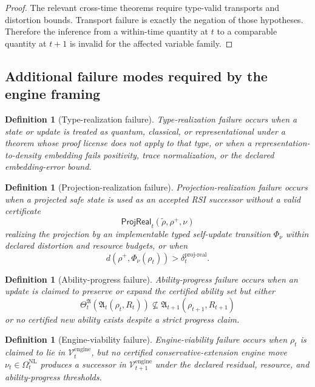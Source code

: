 \documentclass[11pt]{article}
\newtheorem{definition}[theorem]{Definition}
\newcommand{\1}{\mathbf{1}}
\providecommand{\Vcal}{\mathcal{V}}
\providecommand{\proj}{\mathrm{proj}}
\providecommand{\real}{\mathrm{real}}
\begin{document}
\begin{proof}
The relevant cross-time theorems require type-valid transports and distortion bounds. Transport failure is exactly the negation of those hypotheses. Therefore the inference from a within-time quantity at \(t\) to a comparable quantity at \(t+1\) is invalid for the affected variable family.
\end{proof}

\subsection{Additional failure modes required by the engine framing}

\begin{definition}[Type-realization failure]
Type-realization failure occurs when a state or update is treated as quantum, classical, or representational under a theorem whose proof license does not apply to that type, or when a representation-to-density embedding fails positivity, trace normalization, or the declared embedding-error bound.
\end{definition}

\begin{definition}[Projection-realization failure]
Projection-realization failure occurs when a projected safe state is used as an accepted RSI successor without a valid certificate
\[
\mathsf{ProjReal}_t(\tilde\rho,\rho^+,\nu)
\]
realizing the projection by an implementable typed self-update transition \(\Phi_\nu\) within declared distortion and resource budgets, or when
\[
d(\rho^+,\Phi_\nu(\rho_t))>\delta_t^{\proj\mbox{-}\real}.
\]
\end{definition}

\begin{definition}[Ability-progress failure]
Ability-progress failure occurs when an update is claimed to preserve or expand the certified ability set but either
\[
\Theta_t^{\mathfrak A}(\mathfrak A_t(\rho_t,R_t))
\nsubseteq
\mathfrak A_{t+1}(\rho_{t+1},R_{t+1})
\]
or no certified new ability exists despite a strict progress claim.
\end{definition}

\begin{definition}[Engine-viability failure]
Engine-viability failure occurs when \(\rho_t\) is claimed to lie in \(\Vcal_t^{\mathrm{engine}}\), but no certified conservative-extension engine move \(\nu_t\in\Omega_t^{\mathrm{NL}}\) produces a successor in \(\Vcal_{t+1}^{\mathrm{engine}}\) under the declared residual, resource, and ability-progress thresholds.
\end{definition}
\end{document}
